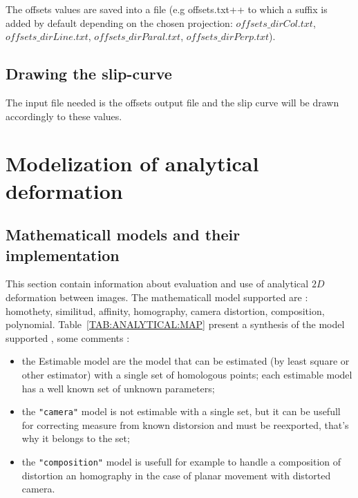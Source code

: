 The offsets values are saved into a file (e.g \verb++offsets.txt++ to which a suffix is added by default depending on the chosen projection: $offsets\_dirCol.txt$,  $offsets\_dirLine.txt$, $offsets\_dirParal.txt$, $offsets\_dirPerp.txt$).

\subsection{Drawing the slip-curve}
The input file needed is the offsets output file and the slip curve will be drawn accordingly to these values.



\section{Modelization of analytical deformation}

\subsection{Mathematicall models and their implementation}

This section contain information about evaluation and use of analytical  $2D$
deformation  between images. The mathematicall model supported are :
homothety, similitud, affinity, homography, camera distortion, composition, polynomial.
Table~\ref{TAB:ANALYTICAL:MAP} present a synthesis of the model supported ,
some comments :

\begin{itemize}
   \item the Estimable model are the model that can be estimated (by least square or
         other estimator) with a single set of homologous points; each estimable model 
         has a well known set of unknown parameters;

   \item the {\tt "camera"} model is not estimable with a single set, but it can be usefull
         for correcting measure from known distorsion and must be reexported, that's why it belongs 
         to the set;

   \item the {\tt "composition"} model is usefull for example to  handle a composition of
         distortion an homography in the case of planar movement with distorted camera.
\end{itemize}




